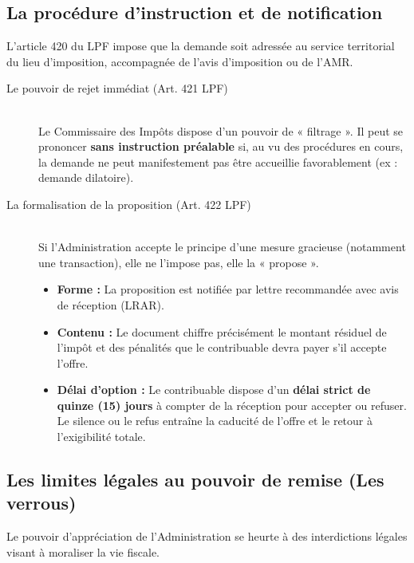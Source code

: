 \documentclass[Cours_contentieuxTF2026.tex]{subfiles}
\begin{document}
 \subsection{La procédure d'instruction et de notification}
 
 L'article 420 du LPF impose que la demande soit adressée au service territorial du lieu d'imposition, accompagnée de l'avis d'imposition ou de l'AMR.
 
 \begin{description}
 	\item[Le pouvoir de rejet immédiat (Art. 421 LPF)] \hfill \\
 	Le Commissaire des Impôts dispose d'un pouvoir de « filtrage ». Il peut se prononcer \textbf{sans instruction préalable} si, au vu des procédures en cours, la demande ne peut manifestement pas être accueillie favorablement (ex : demande dilatoire).
 	
 	\item[La formalisation de la proposition (Art. 422 LPF)] \hfill \\
 	Si l'Administration accepte le principe d'une mesure gracieuse (notamment une transaction), elle ne l'impose pas, elle la « propose ».
 	\begin{itemize}
 		\item \textbf{Forme :} La proposition est notifiée par lettre recommandée avec avis de réception (LRAR).
 		\item \textbf{Contenu :} Le document chiffre précisément le montant résiduel de l'impôt et des pénalités que le contribuable devra payer s'il accepte l'offre.
 		\item \textbf{Délai d'option :} Le contribuable dispose d'un \textbf{délai strict de quinze (15) jours} à compter de la réception pour accepter ou refuser. Le silence ou le refus entraîne la caducité de l'offre et le retour à l'exigibilité totale.
 	\end{itemize}
 \end{description}
 
 \subsection{Les limites légales au pouvoir de remise (Les verrous)}
 
 Le pouvoir d'appréciation de l'Administration se heurte à des interdictions légales visant à moraliser la vie fiscale.
 
\end{document}

